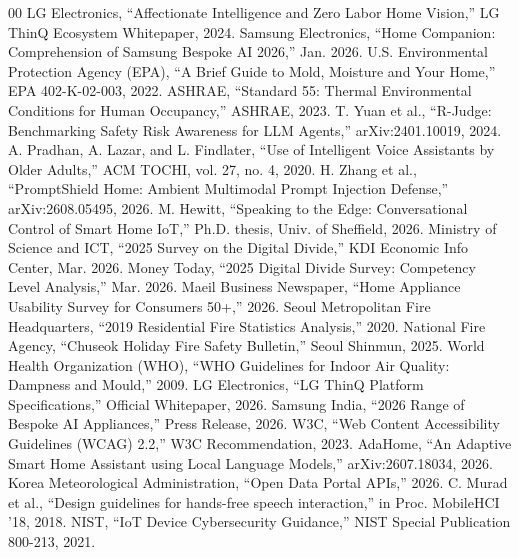 \documentclass[conference]{IEEEtran}
\begin{document}
\begin{thebibliography}{00}
 LG Electronics, ``Affectionate Intelligence and Zero Labor Home Vision,'' LG ThinQ Ecosystem Whitepaper, 2024.
 Samsung Electronics, ``Home Companion: Comprehension of Samsung Bespoke AI 2026,'' Jan. 2026.
 U.S. Environmental Protection Agency (EPA), ``A Brief Guide to Mold, Moisture and Your Home,'' EPA 402-K-02-003, 2022.
 ASHRAE, ``Standard 55: Thermal Environmental Conditions for Human Occupancy,'' ASHRAE, 2023.
 T. Yuan et al., ``R-Judge: Benchmarking Safety Risk Awareness for LLM Agents,'' arXiv:2401.10019, 2024.
 A. Pradhan, A. Lazar, and L. Findlater, ``Use of Intelligent Voice Assistants by Older Adults,'' ACM TOCHI, vol. 27, no. 4, 2020.
 H. Zhang et al., ``PromptShield Home: Ambient Multimodal Prompt Injection Defense,'' arXiv:2608.05495, 2026.
 M. Hewitt, ``Speaking to the Edge: Conversational Control of Smart Home IoT,'' Ph.D. thesis, Univ. of Sheffield, 2026.
 Ministry of Science and ICT, ``2025 Survey on the Digital Divide,'' KDI Economic Info Center, Mar. 2026.
 Money Today, ``2025 Digital Divide Survey: Competency Level Analysis,'' Mar. 2026.
 Maeil Business Newspaper, ``Home Appliance Usability Survey for Consumers 50+,'' 2026.
 Seoul Metropolitan Fire Headquarters, ``2019 Residential Fire Statistics Analysis,'' 2020.
 National Fire Agency, ``Chuseok Holiday Fire Safety Bulletin,'' Seoul Shinmun, 2025.
 World Health Organization (WHO), ``WHO Guidelines for Indoor Air Quality: Dampness and Mould,'' 2009.
 LG Electronics, ``LG ThinQ Platform Specifications,'' Official Whitepaper, 2026.
 Samsung India, ``2026 Range of Bespoke AI Appliances,'' Press Release, 2026.
 W3C, ``Web Content Accessibility Guidelines (WCAG) 2.2,'' W3C Recommendation, 2023.
 AdaHome, ``An Adaptive Smart Home Assistant using Local Language Models,'' arXiv:2607.18034, 2026.
 Korea Meteorological Administration, ``Open Data Portal APIs,'' 2026.
 C. Murad et al., ``Design guidelines for hands-free speech interaction,'' in Proc. MobileHCI '18, 2018.
 NIST, ``IoT Device Cybersecurity Guidance,'' NIST Special Publication 800-213, 2021.
\end{thebibliography}
\end{document}
